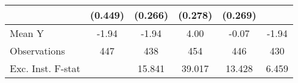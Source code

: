 {\begin{tabular}{l*{5}{c}}
            &     (0.449)         &     (0.266)         &     (0.278)         &     (0.269)         &                     \\
\midrule
Mean Y      &       -1.94         &       -1.94         &        4.00         &       -0.07         &       -1.94         \\
Observations&         447         &         438         &         454         &         446         &         430         \\
Exc. Inst. F-stat&                     &      15.841         &      39.017         &      13.428         &       6.459         \\
\bottomrule
\end{tabular}
}

